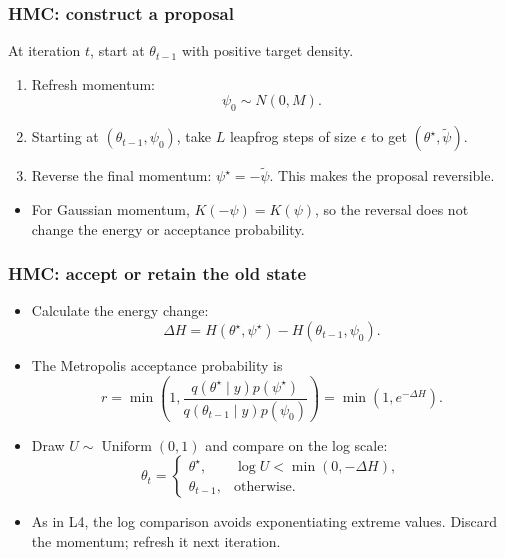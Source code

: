 \documentclass[10pt]{beamer}
\begin{document}
\begin{frame}

\frametitle{HMC: construct a proposal}

At iteration $t$, start at $\theta_{t-1}$ with positive target density.
\begin{enumerate}
\item Refresh momentum:
\[
\psi_0 \sim N(0,M).
\]
\pause
\item Starting at $(\theta_{t-1},\psi_0)$, take $L$ leapfrog steps
  of size $\epsilon$ to get $(\theta^\star,\widetilde\psi)$.
\pause
\item Reverse the final momentum: $\psi^\star=-\widetilde\psi$.
  This makes the proposal reversible.
\end{enumerate}
\begin{itemize}
\item For Gaussian momentum, $K(-\psi)=K(\psi)$, so the reversal
  does not change the energy or acceptance probability.
\end{itemize}
\end{frame}

\begin{frame}
\frametitle{HMC: accept or retain the old state}

\begin{itemize}
\item Calculate the energy change:
\[
\Delta H=H(\theta^\star,\psi^\star)
         -H(\theta_{t-1},\psi_0).
\]
\item The Metropolis acceptance probability is
\[
r=\min\!\left(1,
\frac{q(\theta^\star\mid y)p(\psi^\star)}
     {q(\theta_{t-1}\mid y)p(\psi_0)}\right)
 =\min(1,e^{-\Delta H}).
\]
\pause
\item Draw $U\sim\operatorname{Uniform}(0,1)$ and compare on the log scale:
\[
\theta_t=\begin{cases}
\theta^\star, & \log U<\min(0,-\Delta H),\\
\theta_{t-1}, & \text{otherwise}.
\end{cases}
\]
\item As in L4, the log comparison avoids exponentiating extreme values.
  Discard the momentum; refresh it next iteration.
\end{itemize}
\end{frame}
\end{document}
